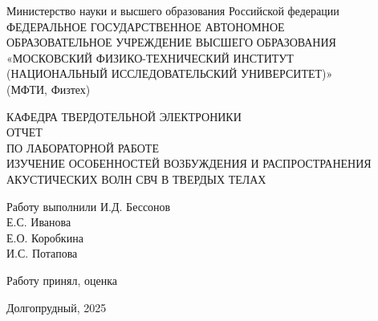 \documentclass[a4paper, 12pt]{article}
\begin{document}
\begin{titlepage}
    \newpage
    \begin{center}
     Министерство науки и высшего образования Российской федерации \\ ФЕДЕРАЛЬНОЕ ГОСУДАРСТВЕННОЕ АВТОНОМНОЕ \\ ОБРАЗОВАТЕЛЬНОЕ УЧРЕЖДЕНИЕ ВЫСШЕГО ОБРАЗОВАНИЯ \\ «МОСКОВСКИЙ ФИЗИКО-ТЕХНИЧЕСКИЙ ИНСТИТУТ \\ (НАЦИОНАЛЬНЫЙ ИССЛЕДОВАТЕЛЬСКИЙ УНИВЕРСИТЕТ)» \\ (МФТИ, Физтех)
    \end{center}
    
    \vspace{15em}
    
    \begin{center}
    КАФЕДРА ТВЕРДОТЕЛЬНОЙ ЭЛЕКТРОНИКИ \\
    \vspace{1em}
    ОТЧЕТ\\
    ПО ЛАБОРАТОРНОЙ РАБОТЕ \\
    \vspace{1em}
    ИЗУЧЕНИЕ ОСОБЕННОСТЕЙ ВОЗБУЖДЕНИЯ И РАСПРОСТРАНЕНИЯ АКУСТИЧЕСКИХ ВОЛН СВЧ В ТВЕРДЫХ ТЕЛАХ 
    \end{center}

    \vspace{10em}
    \begin{flushleft}
        Работу выполнили \hspace{17em} \underline{\hspace{3cm}}
        И.Д. Бессонов \\
         \hspace{26em} \underline{\hspace{3cm}} Е.С. Иванова \\
          \hspace{26em} \underline{\hspace{2.6cm}} Е.О. Коробкина\\
        \hspace{26em}
        И.С. Потапова
    \end{flushleft}

    \vspace{1em}

    \begin{flushleft}
        Работу принял, оценка
        \hspace{15em}
    \end{flushleft}

    \vspace{5em}
    
    \begin{center}
        Долгопрудный, 2025
    \end{center}
\end{titlepage}
\end{document}
